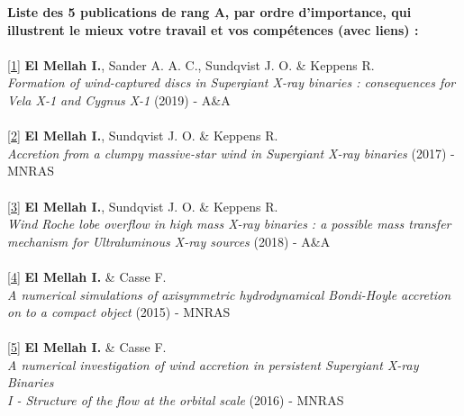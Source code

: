 \documentclass[11pt]{article}
\begin{document}
{\bf Liste des 5 publications de rang A, par ordre d'importance, qui illustrent le mieux votre travail et vos comp\'etences   (avec liens) :}\\ \\
\href{http://adsabs.harvard.edu/abs/2018arXiv181012933E}{[1]} \textbf{El Mellah I.}, Sander A. A. C., Sundqvist J. O. \& Keppens R.\\ 
\emph{	Formation of wind-captured discs in Supergiant X-ray binaries : consequences for Vela X-1 and Cygnus X-1} (2019) - A\&A \\ \\
\href{http://adsabs.harvard.edu/abs/2017arXiv171108709E}{[2]} \textbf{El Mellah I.}, Sundqvist J. O. \& Keppens R.\\ 
\emph{Accretion from a clumpy massive-star wind in Supergiant X-ray binaries} (2017) - MNRAS\\ \\
\href{http://adsabs.harvard.edu/abs/2018arXiv181012937E}{[3]} \textbf{El Mellah I.}, Sundqvist J. O. \& Keppens R.\\ 
\emph{	Wind Roche lobe overflow in high mass X-ray binaries : a possible mass transfer mechanism for Ultraluminous X-ray sources} (2018) - A\&A \\ \\
\href{http://adsabs.harvard.edu/abs/2015MNRAS.454.2657E}{[4]} \textbf{El Mellah I.} \& Casse F. \\ 
\emph{A numerical simulations of axisymmetric hydrodynamical Bondi-Hoyle accretion}\\
\emph{on to a compact object} (2015) - MNRAS\\ \\
\href{http://adsabs.harvard.edu/abs/2017MNRAS.467.2585E}{[5]} \textbf{El Mellah I.} \& Casse F. \\ 
\emph{A numerical investigation of wind accretion in persistent Supergiant X-ray Binaries}\\
\emph{I - Structure of the flow at the orbital scale} (2016) - MNRAS\\ \\
\end{document}
